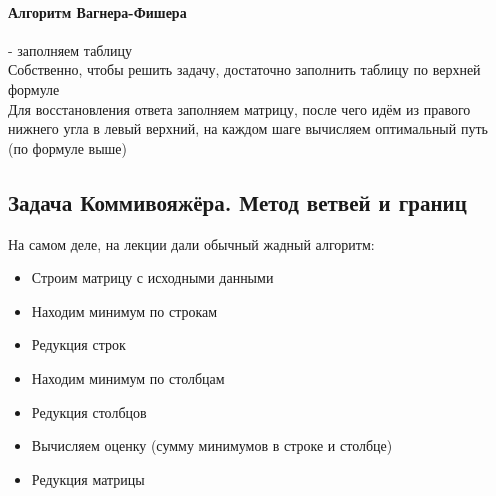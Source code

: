 \documentclass[a4paper,10pt]{article}
\begin{document}
\paragraph{Алгоритм Вагнера-Фишера} - заполняем таблицу\\
Собственно, чтобы решить задачу, достаточно заполнить таблицу по верхней формуле \\
Для восстановления ответа заполняем матрицу, после чего идём из правого нижнего угла в левый верхний, на каждом шаге вычисляем оптимальный путь (по формуле выше) \\
\subsection{Задача Коммивояжёра. Метод ветвей и границ} 
На самом деле, на лекции дали обычный жадный алгоритм:
\begin{itemize}
	\item Строим матрицу с исходными данными
	\item Находим минимум по строкам
	\item Редукция строк
	\item Находим минимум по столбцам
	\item Редукция столбцов
	\item Вычисляем оценку (сумму минимумов в строке и столбце) 
	\item Редукция матрицы
\end{itemize}
\end{document}
